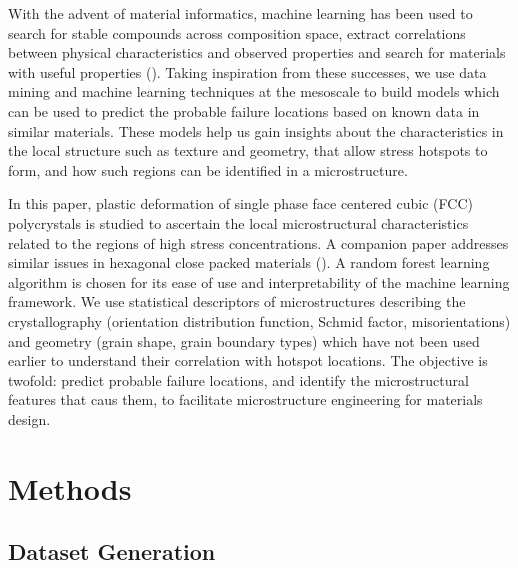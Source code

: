 \documentclass[preprint,1p,times,authoryear]{elsarticle}%
\begin{document}
With the advent of material informatics, machine learning has been used to search for stable compounds across composition space, extract correlations between physical characteristics and observed properties and search for materials with useful properties (\cite{Orme2016,Rajan2015}). Taking inspiration from these successes, we use data mining and machine learning techniques at the mesoscale to build models which can be used to predict the probable failure locations based on known data in similar materials. These models help us gain insights about the characteristics in the local structure such as texture and geometry, that allow stress hotspots to form, and how such regions can be identified in a microstructure.

In this paper, plastic deformation of single phase face centered cubic (FCC) polycrystals is studied to ascertain the local microstructural characteristics related to the regions of high stress concentrations. A companion paper addresses similar issues in hexagonal close packed materials (\cite{Mangal2017c}). A random forest learning algorithm is chosen for its ease of use and interpretability of the machine learning framework. We use statistical descriptors of microstructures describing the crystallography (orientation distribution function, Schmid factor, misorientations) and  geometry (grain shape, grain boundary types) which have not been used earlier to understand their correlation with hotspot locations. The objective is twofold: predict probable failure locations, and identify the microstructural features that caus them, to facilitate microstructure engineering for materials design. 

\section{Methods}
\subsection{Dataset Generation}
\end{document}
